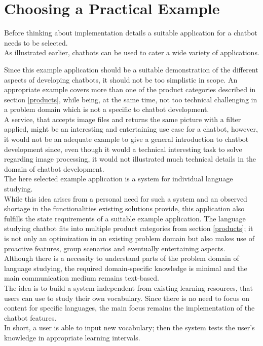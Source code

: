 \section{Choosing a Practical Example}

Before thinking about implementation details a suitable application for a chatbot needs to be selected.
\\
As illustrated earlier, chatbots can be used to cater a wide variety of applications.

Since this example application should be a suitable demonstration of the different aspects of developing chatbots,
it should not be too simplistic in scope.
An appropriate example covers more than one of the product categories described in section \ref{products},
while being, at the same time, not too technical challenging in a problem domain which is not a specific to chatbot development.
\\
A service, that accepts image files and returns the same picture with a filter applied, might be an interesting and entertaining use case for a chatbot, however, it would not be an adequate example to give a general introduction to chatbot development since, even though it would a technical interesting task to solve regarding image processing, it would not illustrated much technical details in the domain of chatbot development.
\\

The here selected example application is a system for individual language studying.
\\
While this idea arises from a personal need for such a system and an observed shortage in the functionalities existing solutions provide,
this application also fulfills the state requirements of a suitable example application.
The language studying chatbot fits into multiple product categories from section \ref{products}; it is not only an optimization in an existing problem domain but also makes use of proactive features, group scenarios and eventually entertaining aspects.
\\
Although there is a necessity to understand parts of the problem domain of language studying,
the required domain-specific knowledge is minimal and the main communication medium remains text-based.
\\

The idea is to build a system independent from existing learning resources, that users can use to study their own vocabulary.
Since there is no need to focus on content for specific languages, the main focus remains the implementation of the chatbot features.
\\
In short, a user is able to input new vocabulary; then the system tests the user's knowledge in appropriate learning intervals.
